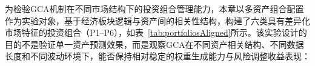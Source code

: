为检验GCA机制在不同市场结构下的投资组合管理能力，本章以多资产组合配置作为实验对象，基于经济板块逻辑与资产间的相关性结构，构建了六类具有差异化市场特征的投资组合（P1--P6），如表~\ref{tab:portfoliosAligned}所示。该实验设计的目的不是验证单一资产预测效果，而是观察GCA在不同资产相关结构、不同数据长度和不同波动环境下，能否保持相对稳定的权重生成能力与风险调整收益表现：




